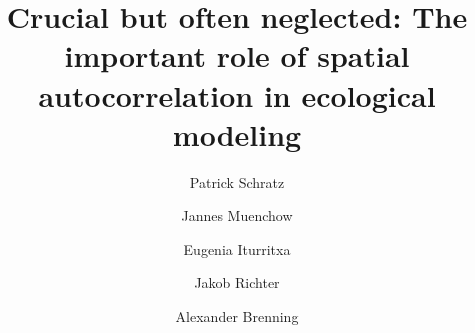 \documentclass[review]{elsarticle}
\begin{document}
 

\begin{frontmatter}

	\title{Crucial but often neglected: The important role of spatial autocorrelation in ecological modeling} 

	\author[FSU]{Patrick Schratz}

	\author[FSU]{Jannes Muenchow}
	\author[NEIKER]{Eugenia Iturritxa}
	\author[TUDO]{Jakob Richter}
	\author[FSU]{Alexander Brenning}

	\address[FSU]{Department of Geography, GIScience group, Grietgasse 6, 07743, Jena, Germany}
	\address[NEIKER]{NEIKER, Granja Modelo –Arkaute, Apdo. 46, 01080 Vitoria-Gasteiz, Arab, Spain}
	\address[TUDO]{Department of Statistics, TU Dortmund University, Germany}


\end{frontmatter}
\end{document}
